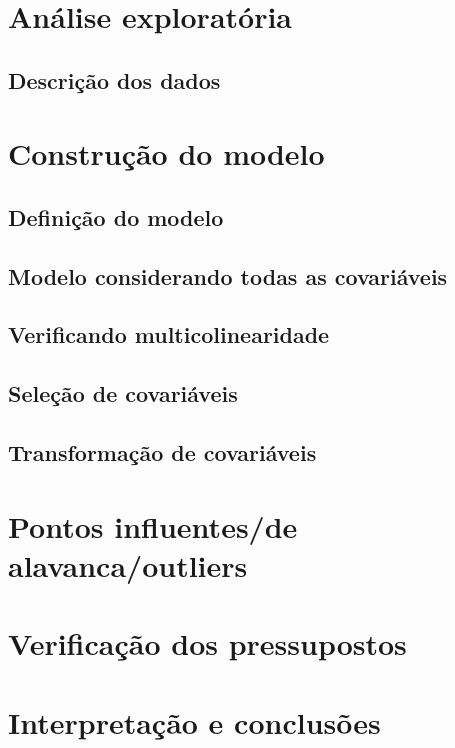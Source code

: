 \documentclass[12pt,a4paper]{article}\usepackage[]{graphicx}\usepackage[]{color}
\begin{document}



\tableofcontents  %




\newpage
\section{{\LARGE\textbf{Análise exploratória}}}


\subsection{\textbf{Descrição dos dados}}


\newpage
\section{{\LARGE\textbf{Construção do modelo}}}

\subsection{\textbf{Definição do modelo}}

\subsection{\textbf{Modelo considerando todas as covariáveis}}

\subsection{\textbf{Verificando multicolinearidade}}




\subsection{\textbf{Seleção de covariáveis}}


\subsection{\textbf{Transformação de covariáveis}}

\newpage
\section{\textbf{Pontos influentes/de alavanca/outliers}}

\newpage
\section{{\LARGE\textbf{Verificação dos pressupostos}}}

\newpage
\section{{\LARGE\textbf{Interpretação e conclusões}}}
\end{document}
